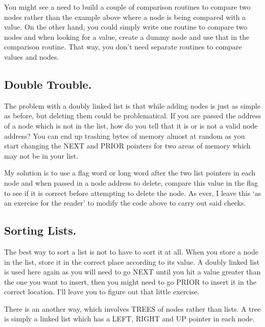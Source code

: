 You might see a need to build a couple of comparison routines to
      compare two nodes rather than the example above where a node is being
      compared with a value. On the other hand, you could simply write one
      routine to compare two nodes and when looking for a value, create a
      dummy node and use that in the comparison routine. That way, you don't
      need separate routines to compare values and nodes.

\subsection{Double Trouble.}
\label{ch10-double-trouble}%

The problem with a doubly linked list is that while adding nodes
      is just as simple as before, but deleting them could be problematical.
      If you are passed the address of a node which is not in the list, how do
      you tell that it is or is not a valid node address? You can end up
      trashing bytes of memory almost at random as you start changing the NEXT
      and PRIOR pointers for two areas of memory which may not be in your
      list.

My solution is to use a flag word or long word after the two list
      pointers in each node and when passed in a node address to delete,
      compare this value in the flag to see if it is correct before attempting
      to delete the node. As ever, I leave this `as an exercise for the
      reader' to modify the code above to carry out said checks.

\subsection{Sorting Lists.}
\label{ch10-sorting-lists}%

The best way to sort a list is not to have to sort it at all. When
      you store a node in the list, store it in the correct place according to
      its value. A doubly linked list is used here again as you will need to
      go NEXT until you hit a value greater than the one you want to insert,
      then you might need to go PRIOR to insert it in the correct location.
      I'll leave you to figure out that little exercise.

There is an another way, which involves TREES of nodes rather than
      lists. A tree is simply a linked list which has a LEFT, RIGHT and UP
      pointer in each node.

